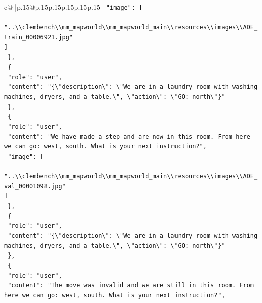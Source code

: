 \documentclass{article}
\begin{document}
{\begin{supertabular}{c@{$\;$}|p{.15\linewidth}@{}p{.15\linewidth}p{.15\linewidth}p{.15\linewidth}p{.15\linewidth}p{.15\linewidth}}
{{{\texttt{    "image": {[}} \\
\texttt{      "..\textbackslash{}\textbackslash{}clembench\textbackslash{}\textbackslash{}mm\_mapworld\textbackslash{}\textbackslash{}mm\_mapworld\_main\textbackslash{}\textbackslash{}resources\textbackslash{}\textbackslash{}images\textbackslash{}\textbackslash{}ADE\_train\_00006921.jpg"} \\
\texttt{    {]}} \\
\texttt{  \},} \\
\texttt{  \{} \\
\texttt{    "role": "user",} \\
\texttt{    "content": "\{\textbackslash{}"description\textbackslash{}": \textbackslash{}"We are in a laundry room with washing machines, dryers, and a table.\textbackslash{}", \textbackslash{}"action\textbackslash{}": \textbackslash{}"GO: north\textbackslash{}"\}"} \\
\texttt{  \},} \\
\texttt{  \{} \\
\texttt{    "role": "user",} \\
\texttt{    "content": "We have made a step and are now in this room. From here we can go: west, south. What is your next instruction?",} \\
\texttt{    "image": {[}} \\
\texttt{      "..\textbackslash{}\textbackslash{}clembench\textbackslash{}\textbackslash{}mm\_mapworld\textbackslash{}\textbackslash{}mm\_mapworld\_main\textbackslash{}\textbackslash{}resources\textbackslash{}\textbackslash{}images\textbackslash{}\textbackslash{}ADE\_val\_00001098.jpg"} \\
\texttt{    {]}} \\
\texttt{  \},} \\
\texttt{  \{} \\
\texttt{    "role": "user",} \\
\texttt{    "content": "\{\textbackslash{}"description\textbackslash{}": \textbackslash{}"We are in a laundry room with washing machines, dryers, and a table.\textbackslash{}", \textbackslash{}"action\textbackslash{}": \textbackslash{}"GO: north\textbackslash{}"\}"} \\
\texttt{  \},} \\
\texttt{  \{} \\
\texttt{    "role": "user",} \\
\texttt{    "content": "The move was invalid and we are still in this room. From here we can go: west, south. What is your next instruction?",} \\
}}}
\end{supertabular}}
\end{document}
